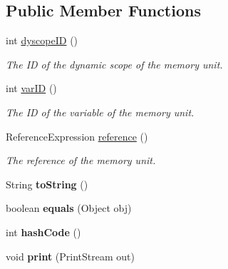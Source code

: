 \subsection*{Public Member Functions}
\begin{DoxyCompactItemize}
\item 
int \hyperlink{classedu_1_1udel_1_1cis_1_1vsl_1_1civl_1_1state_1_1common_1_1immutable_1_1ImmutableMemoryUnit_a10e0b187c3cefc512aa35d6426e2debc}{dyscope\+I\+D} ()
\begin{DoxyCompactList}\small\item\em The I\+D of the dynamic scope of the memory unit. \end{DoxyCompactList}\item 
int \hyperlink{classedu_1_1udel_1_1cis_1_1vsl_1_1civl_1_1state_1_1common_1_1immutable_1_1ImmutableMemoryUnit_a4fb65440d824faecf76cceb308abcf98}{var\+I\+D} ()
\begin{DoxyCompactList}\small\item\em The I\+D of the variable of the memory unit. \end{DoxyCompactList}\item 
Reference\+Expression \hyperlink{classedu_1_1udel_1_1cis_1_1vsl_1_1civl_1_1state_1_1common_1_1immutable_1_1ImmutableMemoryUnit_ac550a6847f0b143c45fc145516ab6414}{reference} ()
\begin{DoxyCompactList}\small\item\em The reference of the memory unit. \end{DoxyCompactList}\item 
\hypertarget{classedu_1_1udel_1_1cis_1_1vsl_1_1civl_1_1state_1_1common_1_1immutable_1_1ImmutableMemoryUnit_a87b73cd72308035c653c2944d988e0f2}{}String {\bfseries to\+String} ()\label{classedu_1_1udel_1_1cis_1_1vsl_1_1civl_1_1state_1_1common_1_1immutable_1_1ImmutableMemoryUnit_a87b73cd72308035c653c2944d988e0f2}

\item 
\hypertarget{classedu_1_1udel_1_1cis_1_1vsl_1_1civl_1_1state_1_1common_1_1immutable_1_1ImmutableMemoryUnit_ab9187199cdba7a827e7a42d6c9720cab}{}boolean {\bfseries equals} (Object obj)\label{classedu_1_1udel_1_1cis_1_1vsl_1_1civl_1_1state_1_1common_1_1immutable_1_1ImmutableMemoryUnit_ab9187199cdba7a827e7a42d6c9720cab}

\item 
\hypertarget{classedu_1_1udel_1_1cis_1_1vsl_1_1civl_1_1state_1_1common_1_1immutable_1_1ImmutableMemoryUnit_aca818414d9efed1bc5b5b5881c110656}{}int {\bfseries hash\+Code} ()\label{classedu_1_1udel_1_1cis_1_1vsl_1_1civl_1_1state_1_1common_1_1immutable_1_1ImmutableMemoryUnit_aca818414d9efed1bc5b5b5881c110656}

\item 
\hypertarget{classedu_1_1udel_1_1cis_1_1vsl_1_1civl_1_1state_1_1common_1_1immutable_1_1ImmutableMemoryUnit_a3d502ac0c6873baed8423538469fe6f5}{}void {\bfseries print} (Print\+Stream out)\label{classedu_1_1udel_1_1cis_1_1vsl_1_1civl_1_1state_1_1common_1_1immutable_1_1ImmutableMemoryUnit_a3d502ac0c6873baed8423538469fe6f5}

\end{DoxyCompactItemize}


